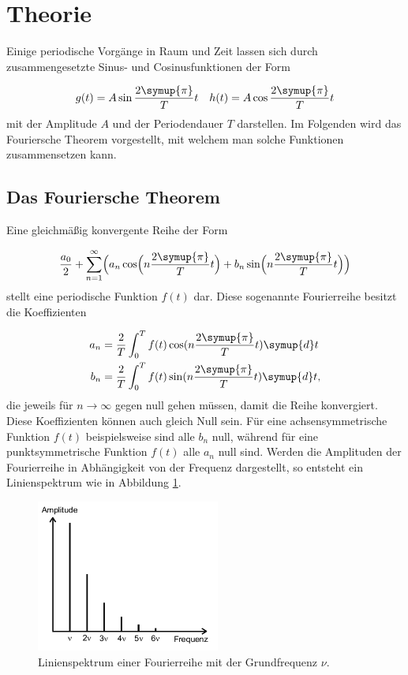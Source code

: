 \section{Theorie}
\label{sec:Theorie}

Einige periodische Vorgänge in Raum und Zeit lassen sich durch
zusammengesetzte Sinus- und Cosinusfunktionen der Form

\begin{align}
  g(t) & = A\sin \frac{2\symup{\pi}}{T}t & h(t) & =
  A\cos \frac{2\symup{\pi}}{T}t \\
\end{align}
mit der Amplitude $A$ und der Periodendauer $T$ darstellen. Im Folgenden
wird das Fouriersche Theorem vorgestellt, mit welchem man solche Funktionen
zusammensetzen kann.

\subsection{Das Fouriersche Theorem}

Eine gleichmäßig konvergente Reihe der Form

\begin{equation}
  \frac{a_0}{2} + \sum_{n=1}^{\infty} \Bigl(a_n \cos
  \Bigl(n\frac{2\symup{\pi}}{T}t\Bigr)
  + b_n \sin \Bigl(n\frac{2\symup{\pi}}{T}t\Bigr)\Bigr)
\end{equation}
stellt eine periodische Funktion $f(t)$ dar.
Diese sogenannte Fourierreihe besitzt die Koeffizienten

\begin{align}
  a_n & = \frac{2}{T}
  \int_{0}^{T} f(t) \cos (n\frac{2\symup{\pi}}{T}t) \symup{d}t
  \\
  b_n & = \frac{2}{T}
  \int_{0}^{T} f(t) \sin (n\frac{2\symup{\pi}}{T}t) \symup{d}t,
  \label{eqn:anbn}
\end{align}
die jeweils für $n \to \infty$ gegen null gehen müssen, damit die Reihe
konvergiert. Diese Koeffizienten können auch gleich Null sein.
Für eine achsensymmetrische Funktion $f(t)$ beispielsweise sind alle $b_n$ null,
während für eine punktsymmetrische Funktion $f(t)$ alle $a_n$ null sind.
Werden die Amplituden der Fourierreihe in Abhängigkeit von der Frequenz
dargestellt,
so entsteht ein Linienspektrum wie in Abbildung \ref{fig:Linienspektrum}.

\newpage

\begin{figure}
  \centering
  \includegraphics[height = 5cm]{Linienspektrum.png}
  \caption{Linienspektrum einer Fourierreihe mit der Grundfrequenz $\nu$.}
  \label{fig:Linienspektrum}
\end{figure}



